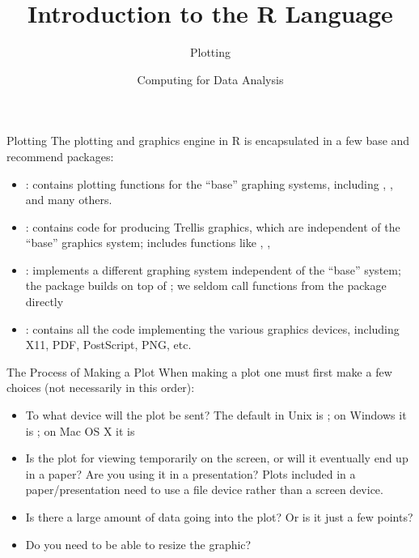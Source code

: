 \documentclass[aspectratio=169]{beamer}
\title[The R Language]{Introduction to the R Language}
\subtitle{Plotting}
\date{Computing for Data Analysis}
\begin{document}
\begin{frame}
  \titlepage
\end{frame}


\begin{frame}{Plotting}
The plotting and graphics engine in R is encapsulated in a few base
and recommend packages:
\begin{itemize}
\item
{}: contains plotting functions for the ``base'' graphing
systems, including , ,  and many
others.
\item
  : contains code for producing Trellis graphics, which are
  independent of the ``base'' graphics system; includes functions like
  , , 
\item
  : implements a different graphing system independent of the
  ``base'' system; the  package builds on top of
  ; we seldom call functions from the  package
directly
\item
{}: contains all the code implementing the various
graphics devices, including X11, PDF, PostScript, PNG, etc.
\end{itemize}
\end{frame}

\begin{frame}{The Process of Making a Plot}
  When making a plot one must first make a few choices (not
  necessarily in this order):
\begin{itemize}
\item To what device will the plot be sent?  The default in Unix is
  ; on Windows it is ; on Mac OS X it is
\item Is the plot for viewing temporarily on the screen, or will it
  eventually end up in a paper?  Are you using it in a presentation?
  Plots included in a paper/presentation need to use a file device
  rather than a screen device.
\item
Is there a large amount of data going into the plot?  Or is it just a
few points?  
\item
Do you need to be able to resize the graphic?  
\end{itemize}
\end{frame}
\end{document}
